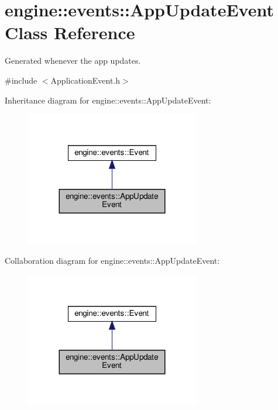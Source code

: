 \hypertarget{classengine_1_1events_1_1AppUpdateEvent}{}\section{engine\+:\+:events\+:\+:App\+Update\+Event Class Reference}
\label{classengine_1_1events_1_1AppUpdateEvent}


Generated whenever the app updates.  




{\ttfamily \#include $<$Application\+Event.\+h$>$}



Inheritance diagram for engine\+:\+:events\+:\+:App\+Update\+Event\+:\nopagebreak
\begin{figure}[H]
\begin{center}
\leavevmode
\includegraphics[width=215pt]{classengine_1_1events_1_1AppUpdateEvent__inherit__graph}
\end{center}
\end{figure}


Collaboration diagram for engine\+:\+:events\+:\+:App\+Update\+Event\+:\nopagebreak
\begin{figure}[H]
\begin{center}
\leavevmode
\includegraphics[width=215pt]{classengine_1_1events_1_1AppUpdateEvent__coll__graph}
\end{center}
\end{figure}
